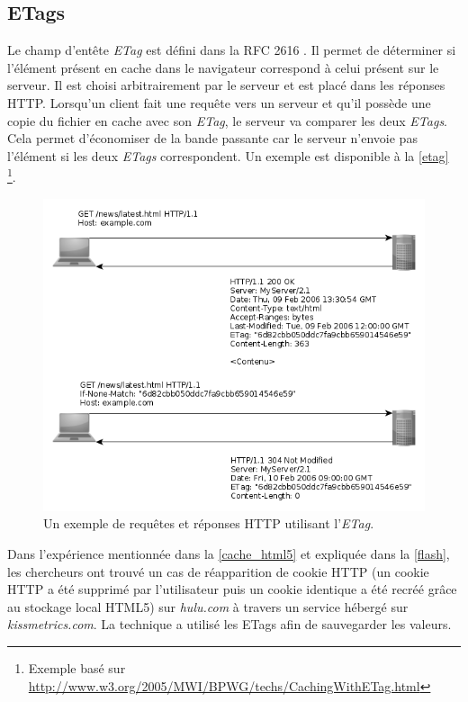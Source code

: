 \subsection{ETags}
\label{cache_etags}
Le champ d'entête \textit{ETag} est défini dans la RFC 2616 \cite{IETF_RFC2616}. Il permet de déterminer si l'élément présent en cache dans le navigateur correspond à celui présent sur le serveur. Il est choisi arbitrairement par le serveur et est placé dans les réponses HTTP. Lorsqu'un client fait une requête vers un serveur et qu'il possède une copie du fichier en cache avec son \textit{ETag}, le serveur va comparer les deux \textit{ETags}. Cela permet d'économiser de la bande passante car le serveur n'envoie pas l'élément si les deux \textit{ETags} correspondent. Un exemple est disponible à la \autoref{etag} \footnote{Exemple basé sur \url{http://www.w3.org/2005/MWI/BPWG/techs/CachingWithETag.html}}.
\begin{figure}[h]
	\centering
	\includegraphics[scale=0.8]{figures/ETag_NB.png}
	\caption{\label{etag}Un exemple de requêtes et réponses HTTP utilisant l'\textit{ETag}.}
\end{figure}
\newline

Dans l'expérience mentionnée dans la \autoref{cache_html5} et expliquée dans la \autoref{flash}, les chercheurs ont trouvé un cas de réapparition de cookie HTTP (un cookie HTTP a été supprimé par l'utilisateur puis un cookie identique a été recréé grâce au stockage local HTML5) sur \textit{hulu.com} à travers un service hébergé sur \textit{kissmetrics.com}. La technique a utilisé les ETags afin de sauvegarder les valeurs.
\newline


